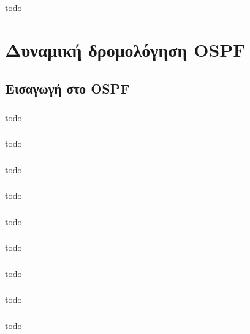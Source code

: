 \documentclass[a4paper, 12pt]{article}
\begin{document}
		\subsubsection{}
			todo

\section{Δυναμική δρομολόγηση OSPF}

	\subsection{Εισαγωγή στο OSPF}

		\subsubsection{}
			todo

		\subsubsection{}
			todo

		\subsubsection{}
			todo

		\subsubsection{}
			todo

		\subsubsection{}
			todo

		\subsubsection{}
			todo

		\subsubsection{}
			todo

		\subsubsection{}
			todo

		\subsubsection{}
			todo
\end{document}
